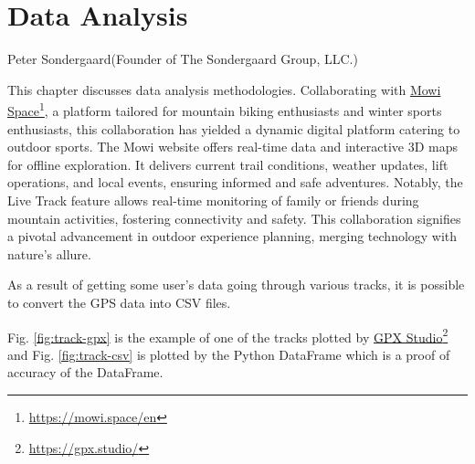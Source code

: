 %
\chapter{Data Analysis}
\label{sec:data}

{Peter Sondergaard}{(Founder of The Sondergaard Group, LLC.)}


This chapter discusses data analysis methodologies. Collaborating with \href{https://mowi.space/en}{Mowi Space}\footnote{\url{https://mowi.space/en}}, a platform tailored for mountain biking enthusiasts and winter sports enthusiasts, this collaboration has yielded a dynamic digital platform catering to outdoor sports. The Mowi website offers real-time data and interactive 3D maps for offline exploration. It delivers current trail conditions, weather updates, lift operations, and local events, ensuring informed and safe adventures. Notably, the Live Track feature allows real-time monitoring of family or friends during mountain activities, fostering connectivity and safety. This collaboration signifies a pivotal advancement in outdoor experience planning, merging technology with nature's allure.

As a result of getting some user's data going through various tracks,
it is possible to convert the GPS data into CSV files.

Fig. \ref{fig:track-gpx} is the example of one of the tracks plotted by 
\href{https://gpx.studio/}{GPX Studio}\footnote{\url{https://gpx.studio/}} and 
Fig. \ref{fig:track-csv} is plotted by the Python DataFrame which is a proof of accuracy of the DataFrame.

